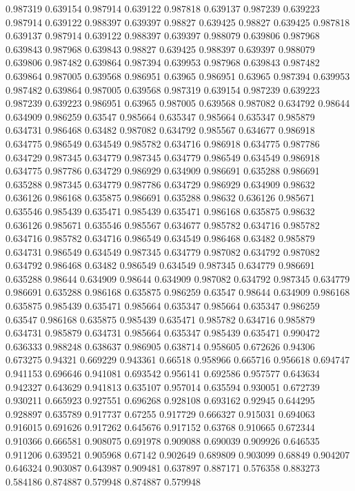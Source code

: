 0.987319 0.639154
0.987914 0.639122
0.987818 0.639137
0.987239 0.639223
0.987914 0.639122
0.988397 0.639397
0.98827 0.639425
0.98827 0.639425
0.987818 0.639137
0.987914 0.639122
0.988397 0.639397
0.988079 0.639806
0.987968 0.639843
0.987968 0.639843
0.98827 0.639425
0.988397 0.639397
0.988079 0.639806
0.987482 0.639864
0.987394 0.639953
0.987968 0.639843
0.987482 0.639864
0.987005 0.639568
0.986951 0.63965
0.986951 0.63965
0.987394 0.639953
0.987482 0.639864
0.987005 0.639568
0.987319 0.639154
0.987239 0.639223
0.987239 0.639223
0.986951 0.63965
0.987005 0.639568
0.987082 0.634792
0.98644 0.634909
0.986259 0.63547
0.985664 0.635347
0.985664 0.635347
0.985879 0.634731
0.986468 0.63482
0.987082 0.634792
0.985567 0.634677
0.986918 0.634775
0.986549 0.634549
0.985782 0.634716
0.986918 0.634775
0.987786 0.634729
0.987345 0.634779
0.987345 0.634779
0.986549 0.634549
0.986918 0.634775
0.987786 0.634729
0.986929 0.634909
0.986691 0.635288
0.986691 0.635288
0.987345 0.634779
0.987786 0.634729
0.986929 0.634909
0.98632 0.636126
0.986168 0.635875
0.986691 0.635288
0.98632 0.636126
0.985671 0.635546
0.985439 0.635471
0.985439 0.635471
0.986168 0.635875
0.98632 0.636126
0.985671 0.635546
0.985567 0.634677
0.985782 0.634716
0.985782 0.634716
0.985782 0.634716
0.986549 0.634549
0.986468 0.63482
0.985879 0.634731
0.986549 0.634549
0.987345 0.634779
0.987082 0.634792
0.987082 0.634792
0.986468 0.63482
0.986549 0.634549
0.987345 0.634779
0.986691 0.635288
0.98644 0.634909
0.98644 0.634909
0.987082 0.634792
0.987345 0.634779
0.986691 0.635288
0.986168 0.635875
0.986259 0.63547
0.98644 0.634909
0.986168 0.635875
0.985439 0.635471
0.985664 0.635347
0.985664 0.635347
0.986259 0.63547
0.986168 0.635875
0.985439 0.635471
0.985782 0.634716
0.985879 0.634731
0.985879 0.634731
0.985664 0.635347
0.985439 0.635471
0.990472 0.636333
0.988248 0.638637
0.986905 0.638714
0.958605 0.672626
0.94306 0.673275
0.94321 0.669229
0.943361 0.66518
0.958966 0.665716
0.956618 0.694747
0.941153 0.696646
0.941081 0.693542
0.956141 0.692586
0.957577 0.643634
0.942327 0.643629
0.941813 0.635107
0.957014 0.635594
0.930051 0.672739
0.930211 0.665923
0.927551 0.696268
0.928108 0.693162
0.92945 0.644295
0.928897 0.635789
0.917737 0.67255
0.917729 0.666327
0.915031 0.694063
0.916015 0.691626
0.917262 0.645676
0.917152 0.63768
0.910665 0.672344
0.910366 0.666581
0.908075 0.691978
0.909088 0.690039
0.909926 0.646535
0.911206 0.639521
0.905968 0.67142
0.902649 0.689809
0.903099 0.68849
0.904207 0.646324
0.903087 0.643987
0.909481 0.637897
0.887171 0.576358
0.883273 0.584186
0.874887 0.579948
0.874887 0.579948
